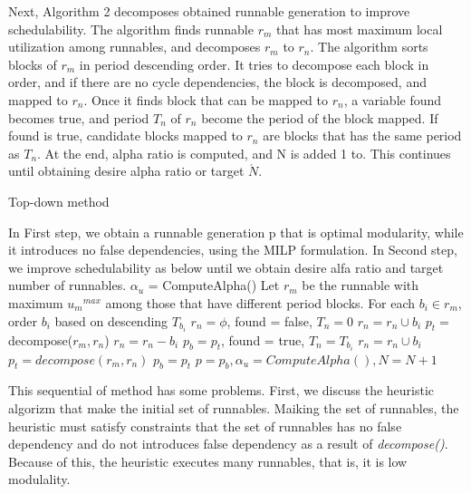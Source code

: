 \documentclass[conference,compsoc]{IEEEtran}
\begin{document}
Next, Algorithm 2 decomposes obtained runnable generation to improve schedulability.
The algorithm finds runnable $r_m$ that has most maximum local utilization among runnables, and decomposes $r_m$ to $r_n$.
The algorithm sorts blocks of $r_m$ in period descending order.
It tries to decompose each block in order, and if there are no cycle dependencies, the block is decomposed, and mapped to $r_n$.
Once it finds block that can be mapped to $r_n$, a variable found becomes true, and period $T_n$ of $r_n$ become the period of the block mapped.
If found is true, candidate blocks mapped to $r_n$ are blocks that has the same period as $T_n$.
At the end, alpha ratio is computed, and N is added 1 to.
This continues until obtaining desire alpha ratio or target $\acute{N}$.


\begin{algorithm}                      
\caption{Top-down method}         
\label{alg2}                        
  
\begin{algorithmic}[1]
\STATE In First step, we obtain a runnable generation p that is optimal modularity, while it introduces no false dependencies, using the MILP formulation.
\STATE In Second step, we improve schedulability as below until we obtain desire alfa ratio and target number of runnables.
\STATE $\alpha_u$ = ComputeAlpha()
	\STATE Let $r_m$ be the runnable with maximum $u{_m}^{max}$ among those that have different period blocks.
	\STATE For each $b_i \in r_m$, order $b_i$ based on descending $T_{b_i}$
	\STATE $r_n = \phi$, found = false, $T_n = 0$
			\STATE $r_n = r_n \cup b_i$
			\STATE $p_t = $ decompose($r_m,r_n$)
				\STATE $r_n = r_n - b_i$
			\ELSE 
			\STATE $p_b = p_t$, found = true, $T_n = T_{b_i}$
			\ENDIF
		\ELSE
				\STATE $r_n = r_n \cup b_i$
				\STATE $p_t = decompose(r_m,r_n)$
			\ELSE
				\STATE $p_b = p_t$
			\ENDIF
		\ENDIF
	\ENDFOR
	\STATE $p = p_b, \alpha_u = ComputeAlpha(), N = N + 1$
\ENDWHILE
\end{algorithmic}
\end{algorithm}

 This sequential of method has some problems.
First, we discuss the heuristic algorizm that make the initial set of runnables.
Maiking the set of runnables, the heuristic must satisfy constraints that the set of runnables has no false dependency and do not introduces false dependency as a result of {\it decompose()}.
Because of this, the heuristic executes many runnables, that is, it is low modulality.
\end{document}
